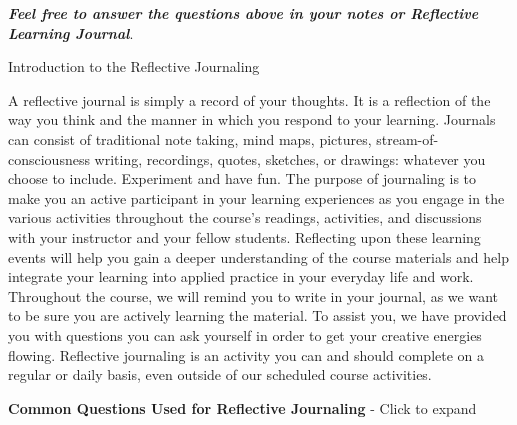 \documentclass[
]{book}
\theoremstyle{definition}
\theoremstyle{definition}
\theoremstyle{definition}
\theoremstyle{definition}
\theoremstyle{remark}
\begin{document}
\begin{reflect}
\textbf{\emph{Feel free to answer the questions above in your notes or Reflective Learning Journal}}.

{Introduction to the Reflective Journaling}

A reflective journal is simply a record of your thoughts. It is a reflection of the way you think and the manner in which you respond to your learning. Journals can consist of traditional note taking, mind maps, pictures, stream-of-consciousness writing, recordings, quotes, sketches, or drawings: whatever you choose to include. Experiment and have fun. The purpose of journaling is to make you an active participant in your learning experiences as you engage in the various activities throughout the course's readings, activities, and discussions with your instructor and your fellow students. Reflecting upon these learning events will help you gain a deeper understanding of the course materials and help integrate your learning into applied practice in your everyday life and work. Throughout the course, we will remind you to write in your journal, as we want to be sure you are actively learning the material. To assist you, we have provided you with questions you can ask yourself in order to get your creative energies flowing. Reflective journaling is an activity you can and should complete on a regular or daily basis, even outside of our scheduled course activities.

\textbf{Common Questions Used for Reflective Journaling} - Click to expand


\end{reflect}
\end{document}
